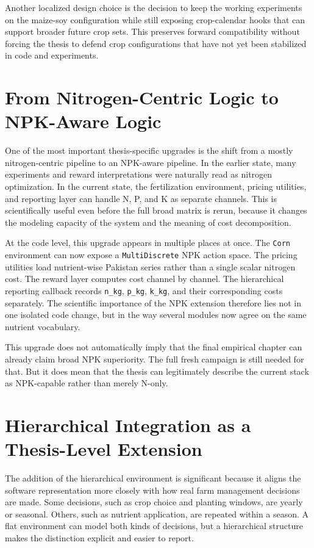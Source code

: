 Another localized design choice is the decision to keep the working experiments on the maize-soy configuration while still exposing crop-calendar hooks that can support broader future crop sets. This preserves forward compatibility without forcing the thesis to defend crop configurations that have not yet been stabilized in code and experiments.

\section{From Nitrogen-Centric Logic to NPK-Aware Logic}

One of the most important thesis-specific upgrades is the shift from a mostly nitrogen-centric pipeline to an NPK-aware pipeline. In the earlier state, many experiments and reward interpretations were naturally read as nitrogen optimization. In the current state, the fertilization environment, pricing utilities, and reporting layer can handle N, P, and K as separate channels. This is scientifically useful even before the full broad matrix is rerun, because it changes the modeling capacity of the system and the meaning of cost decomposition.

At the code level, this upgrade appears in multiple places at once. The \texttt{Corn} environment can now expose a \texttt{MultiDiscrete} NPK action space. The pricing utilities load nutrient-wise Pakistan series rather than a single scalar nitrogen cost. The reward layer computes cost channel by channel. The hierarchical reporting callback records \texttt{n\_kg}, \texttt{p\_kg}, \texttt{k\_kg}, and their corresponding costs separately. The scientific importance of the NPK extension therefore lies not in one isolated code change, but in the way several modules now agree on the same nutrient vocabulary.

This upgrade does not automatically imply that the final empirical chapter can already claim broad NPK superiority. The full fresh campaign is still needed for that. But it does mean that the thesis can legitimately describe the current stack as NPK-capable rather than merely N-only.

\section{Hierarchical Integration as a Thesis-Level Extension}

The addition of the hierarchical environment is significant because it aligns the software representation more closely with how real farm management decisions are made. Some decisions, such as crop choice and planting windows, are yearly or seasonal. Others, such as nutrient application, are repeated within a season. A flat environment can model both kinds of decisions, but a hierarchical structure makes the distinction explicit and easier to report.

